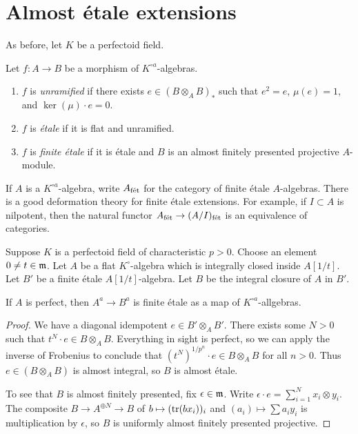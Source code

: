 \documentclass{article}
\begin{document}
\section{Almost \'etale extensions}

As before, let $K$ be a perfectoid field. 

\begin{definition}
Let $f:A\to B$ be a morphism of $K^{\circ a}$-algebras. 
\begin{enumerate}
  \item $f$ is \emph{unramified} if there exists $e\in (B\otimes_A B)_\ast$ 
    such that $e^2=e$, $\mu(e)=1$, and $\ker(\mu)\cdot e=0$. 
  \item $f$ is \emph{\'etale} if it is flat and unramified. 
  \item $f$ is \emph{finite \'etale} if it is \'etale and $B$ is an almost finitely 
presented projective $A$-module. 
\end{enumerate}
\end{definition}

If $A$ is a $K^{\circ a}$-algebra, write $A_{\textnormal{f\'et}}$ for the category of finite 
\'etale $A$-algebras. There is a good deformation theory for finite \'etale 
extensions. For example, if $I\subset A$ is nilpotent, then the natural functor 
$A_{\textnormal{f\'et}} \to (A/I)_{\textnormal{f\'et}}$ is an equivalence of categories. 

Suppose $K$ is a perfectoid field of characteristic $p>0$. Choose an element 
$0\ne t\in\mathfrak{m}$. Let $A$ be a flat $K^\circ$-algebra which is integrally 
closed inside $A[1/t]$. Let $B'$ be a finite \'etale $A[1/t]$-algebra. Let $B$ 
be the integral closure of $A$ in $B'$. 

\begin{proposition}
If $A$ is perfect, then $A^a \to B^a$ is finite \'etale as a map of 
$K^{\circ a}$-allgebras. 
\end{proposition}
\begin{proof}
We have a diagonal idempotent $e\in B'\otimes_A B'$. There exists 
some $N>0$ such that $t^N\cdot e\in B\otimes_A B$. Everything in sight is 
perfect, so we can apply the inverse of Frobenius to conclude that 
$(t^N)^{1/p^n}\cdot e\in B\otimes_A B$ for all $n>0$. Thus  
$e\in (B\otimes_A B)$ is almost integral, so $B$ is almost \'etale. 

To see that $B$ is almost finitely presented, fix $\epsilon\in\mathfrak{m}$. Write 
$\epsilon\cdot e = \sum_{i=1}^N x_i\otimes y_i$. The composite 
$B\to A^{\oplus N} \to B$ of $b\mapsto (\operatorname{tr}(b x_i))_i$ and 
$(a_i)\mapsto \sum a_i y_i$ is multiplication by $\epsilon$, so $B$ is uniformly almost 
finitely presented projective. 
\end{proof}







\end{document}

